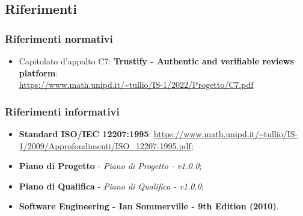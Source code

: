 \subsection{Riferimenti}
    \subsubsection{Riferimenti normativi}
        \begin{itemize}
            \item Capitolato d'appalto C7: \textbf{Trustify - Authentic and verifiable reviews platform}: \\
            \url{https://www.math.unipd.it/~tullio/IS-1/2022/Progetto/C7.pdf}
        \end{itemize}
    \subsubsection{Riferimenti informativi}
        \begin{itemize}
            \item \textbf{Standard ISO/IEC 12207:1995}: \url{https://www.math.unipd.it/~tullio/IS-1/2009/Approfondimenti/ISO_12207-1995.pdf};
            \item \textbf{Piano di Progetto} - \textit{Piano di Progetto - v1.0.0};
            \item \textbf{Piano di Qualifica} - \textit{Piano di Qualifica - v1.0.0};
            \item \textbf{Software Engineering - Ian Sommerville - 9th Edition (2010)}.
        \end{itemize}

